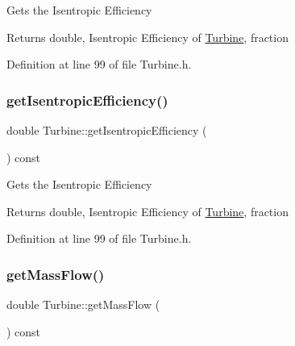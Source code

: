 Gets the Isentropic Efficiency

\begin{DoxyReturn}{Returns}
double, Isentropic Efficiency of \hyperlink{class_turbine}{Turbine}, fraction 
\end{DoxyReturn}


Definition at line 99 of file Turbine.\+h.

\mbox{\label{class_turbine_a5d907859de4acc153a32bd443238b445}} 
\subsubsection{\texorpdfstring{get\+Isentropic\+Efficiency()}{getIsentropicEfficiency()}\hspace{0.1cm}{\footnotesize\ttfamily [3/3]}}
{\footnotesize\ttfamily double Turbine\+::get\+Isentropic\+Efficiency (\begin{DoxyParamCaption}{ }\end{DoxyParamCaption}) const\hspace{0.3cm}{\ttfamily [inline]}}

Gets the Isentropic Efficiency

\begin{DoxyReturn}{Returns}
double, Isentropic Efficiency of \hyperlink{class_turbine}{Turbine}, fraction 
\end{DoxyReturn}


Definition at line 99 of file Turbine.\+h.

\mbox{\label{class_turbine_a4893a203dbbf9db9ca77a0b278c4c118}} 
\subsubsection{\texorpdfstring{get\+Mass\+Flow()}{getMassFlow()}\hspace{0.1cm}{\footnotesize\ttfamily [1/3]}}
{\footnotesize\ttfamily double Turbine\+::get\+Mass\+Flow (\begin{DoxyParamCaption}{ }\end{DoxyParamCaption}) const\hspace{0.3cm}{\ttfamily [inline]}}

